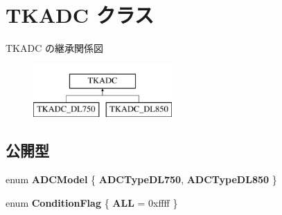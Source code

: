 \hypertarget{class_t_k_a_d_c}{}\section{T\+K\+A\+DC クラス}
\label{class_t_k_a_d_c}
T\+K\+A\+DC の継承関係図\begin{figure}[H]
\begin{center}
\leavevmode
\includegraphics[height=2.000000cm]{class_t_k_a_d_c}
\end{center}
\end{figure}
\subsection*{公開型}
\begin{DoxyCompactItemize}
\item 
\mbox{\label{class_t_k_a_d_c_a0d4ad86996884e94810d3de388fb7b35}} 
enum {\bfseries A\+D\+C\+Model} \{ {\bfseries A\+D\+C\+Type\+D\+L750}, 
{\bfseries A\+D\+C\+Type\+D\+L850}
 \}
\item 
\mbox{\label{class_t_k_a_d_c_ac27c023a4beb7d736056653dd395744a}} 
enum {\bfseries Condition\+Flag} \{ {\bfseries A\+LL} = 0xffff
 \}
\end{DoxyCompactItemize}
